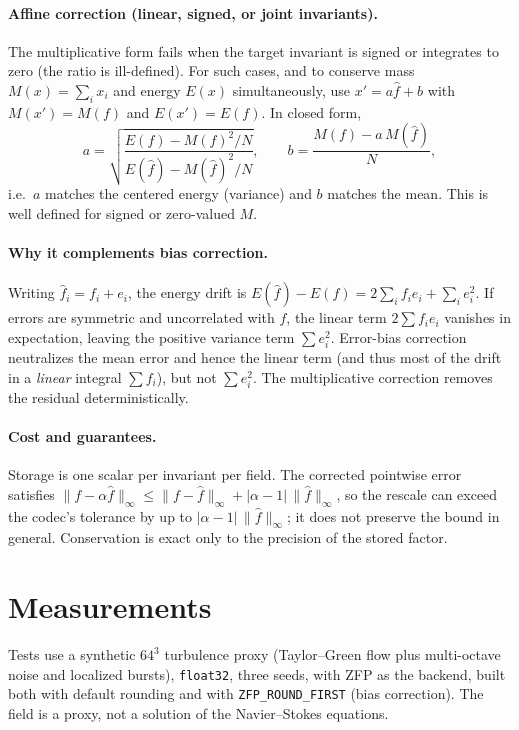 \documentclass[11pt]{article}
\begin{document}
\paragraph{Affine correction (linear, signed, or joint invariants).}
The multiplicative form fails when the target invariant is signed or
integrates to zero (the ratio is ill-defined). For such cases, and to conserve
mass $M(x)=\sum_i x_i$ and energy $E(x)$ simultaneously, use $x'=a\hat f+b$ with
$M(x')=M(f)$ and $E(x')=E(f)$. In closed form,
\begin{equation}
a=\sqrt{\frac{E(f)-M(f)^2/N}{E(\hat f)-M(\hat f)^2/N}},\qquad
b=\frac{M(f)-a\,M(\hat f)}{N},
\end{equation}
i.e.\ $a$ matches the centered energy (variance) and $b$ matches the mean. This
is well defined for signed or zero-valued $M$.

\paragraph{Why it complements bias correction.}
Writing $\hat f_i=f_i+e_i$, the energy drift is
$E(\hat f)-E(f)=2\sum_i f_i e_i+\sum_i e_i^2$. If errors are symmetric and
uncorrelated with $f$, the linear term $2\sum f_i e_i$ vanishes in expectation,
leaving the positive variance term $\sum e_i^2$. Error-bias correction
neutralizes the mean error and hence the linear term (and thus most of the drift
in a \emph{linear} integral $\sum f_i$), but not $\sum e_i^2$. The
multiplicative correction removes the residual deterministically.

\paragraph{Cost and guarantees.}
Storage is one scalar per invariant per field. The corrected pointwise error
satisfies
$\lVert f-\alpha\hat f\rVert_\infty\le\lVert f-\hat f\rVert_\infty
+|\alpha-1|\,\lVert\hat f\rVert_\infty$,
so the rescale can exceed the codec's tolerance by up to
$|\alpha-1|\,\lVert\hat f\rVert_\infty$; it does not preserve the bound in
general. Conservation is exact only to the precision of the stored factor.

\section{Measurements}
Tests use a synthetic $64^3$ turbulence proxy (Taylor--Green flow plus
multi-octave noise and localized bursts), \texttt{float32}, three seeds, with
ZFP as the backend, built both with default rounding and with
\texttt{ZFP\_ROUND\_FIRST} (bias correction). The field is a proxy, not a
solution of the Navier--Stokes equations.
\end{document}

